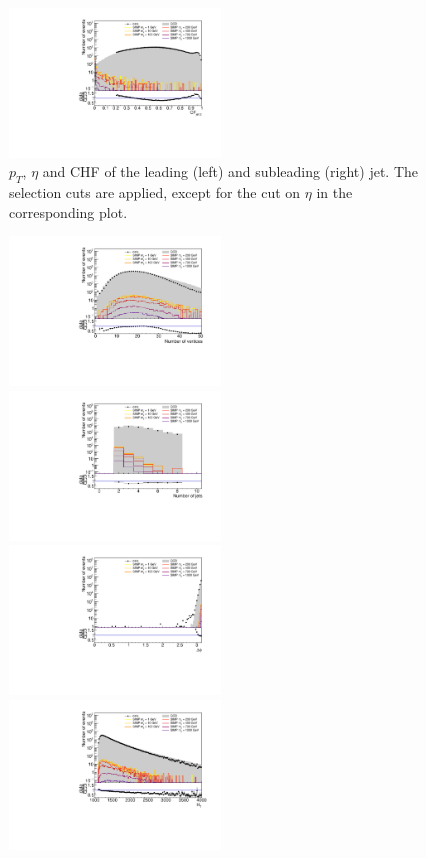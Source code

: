 \begin{figure}[ht]
  \includegraphics[width=0.5\textwidth]{figures/jet2chf_neutrons}
  \caption{$p_T$, $\eta$ and CHF of the leading (left) and subleading (right) jet. The selection cuts are applied, except for the cut on $\eta$ in the corresponding plot.}
  \label{fig:event_selection}
\end{figure}

\begin{figure}[ht]
  \centering
  \includegraphics[width=0.5\textwidth]{figures/nvtx_neutrons}\hfill%
  \includegraphics[width=0.5\textwidth]{figures/njets_neutrons}
  \includegraphics[width=0.5\textwidth]{figures/deltaphi_neutrons}\hfill
  \includegraphics[width=0.5\textwidth]{figures/HT_neutrons}

\end{figure}
